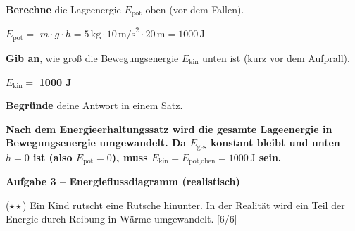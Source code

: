 \documentclass[11pt, a4paper]{article}
\newcommand{\lsg}[1]{\textcolor{loesung}{\textbf{#1}}}
\newcommand{\punktebox}[1]{\hfill\small\textcolor{mittelgrau}{[#1/#1]}}
\newcommand{\aufgabe}[1]{%
    \needspace{4\baselineskip}%
    \vspace{10pt}%
    \noindent\textbf{\textcolor{fachfarbe}{Aufgabe #1}}%
    \vspace{4pt}%
    \nopagebreak[4]%
}
\newcommand{\operator}[1]{\textbf{\textcolor{fachfarbe}{#1}}}
\begin{document}
\begin{teil}
\item \operator{Berechne} die Lageenergie $E_\text{pot}$ oben (vor dem Fallen).

\vspace{0.3em}
$E_\text{pot} = $ \lsg{$m \cdot g \cdot h = 5\,\text{kg} \cdot 10\,\text{m/s}^2 \cdot 20\,\text{m} = 1000\,\text{J}$}

\vspace{0.6em}

\item \operator{Gib an}, wie groß die Bewegungsenergie $E_\text{kin}$ unten ist (kurz vor dem Aufprall).

\vspace{0.3em}
$E_\text{kin} = $ \lsg{1000 J}

\vspace{0.6em}

\item \operator{Begründe} deine Antwort in einem Satz.

\lsg{Nach dem Energieerhaltungssatz wird die gesamte Lageenergie in Bewegungsenergie umgewandelt. Da $E_\text{ges}$ konstant bleibt und unten $h = 0$ ist (also $E_\text{pot} = 0$), muss $E_\text{kin} = E_\text{pot,oben} = 1000\,\text{J}$ sein.}
\end{teil}

\vspace{1em}

\aufgabe{3 – Energieflussdiagramm (realistisch)}

($\star\star$) Ein Kind rutscht eine Rutsche hinunter. In der Realität wird ein Teil der Energie durch Reibung in Wärme umgewandelt. \punktebox{6}
\end{document}
